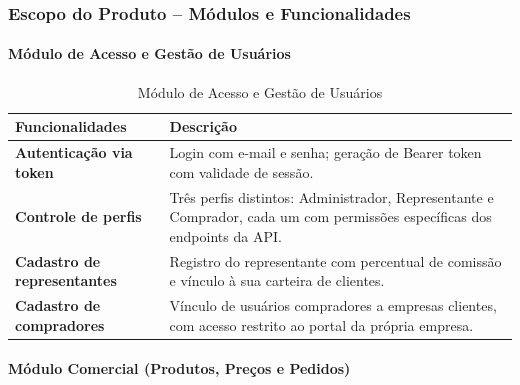 \documentclass[12pt,a4paper]{article}
\begin{document}
\subsubsection{Escopo do Produto -- Módulos e Funcionalidades}

\paragraph*{Módulo de Acesso e Gestão de Usuários}

\begin{table}[h!]
  \centering
  \begin{tabularx}{\textwidth}{>{\bfseries}X X}
    \toprule
    Funcionalidades & Descrição \\
    \midrule
    Autenticação via token &
      Login com e-mail e senha; geração de Bearer token com validade de sessão. \\
    \addlinespace
    Controle de perfis &
      Três perfis distintos: Administrador, Representante e Comprador, cada um com permissões específicas dos endpoints da API. \\
    \addlinespace
    Cadastro de representantes &
      Registro do representante com percentual de comissão e vínculo à sua carteira de clientes. \\
    \addlinespace
    Cadastro de compradores &
      Vínculo de usuários compradores a empresas clientes, com acesso restrito ao portal da própria empresa. \\
    \bottomrule
  \end{tabularx}
  \caption{Módulo de Acesso e Gestão de Usuários}
\end{table}

\paragraph*{Módulo Comercial (Produtos, Preços e Pedidos)}
\end{document}
